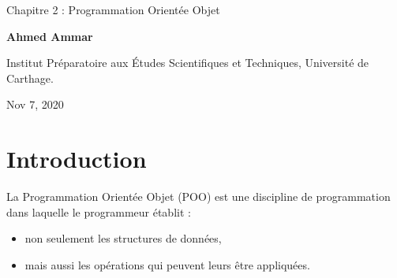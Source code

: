 \documentclass[%
oneside,                 %
final,                   %
10pt]{article}
\begin{document}

\newcommand{\exercisesection}[1]{\subsection*{#1}}






\thispagestyle{empty}

\begin{center}
{\LARGE\bf
\begin{spacing}{1.25}
Chapitre 2 : Programmation Orientée Objet
\end{spacing}
}
\end{center}


\begin{center}
{\bf Ahmed Ammar}
\end{center}

    \begin{center}
\centerline{{\small Institut Préparatoire aux Études Scientifiques et Techniques, Université de Carthage.}}
\end{center}
    


\begin{center}
Nov 7, 2020
\end{center}

\vspace{1cm}


\tableofcontents


\vspace{1cm} %




\section{Introduction}
La Programmation Orientée Objet (POO) est une discipline de programmation dans laquelle le programmeur établit :
\begin{itemize}
\item non seulement les structures de données,

\item mais aussi les opérations qui peuvent leurs être appliquées.
\end{itemize}
\end{document}
